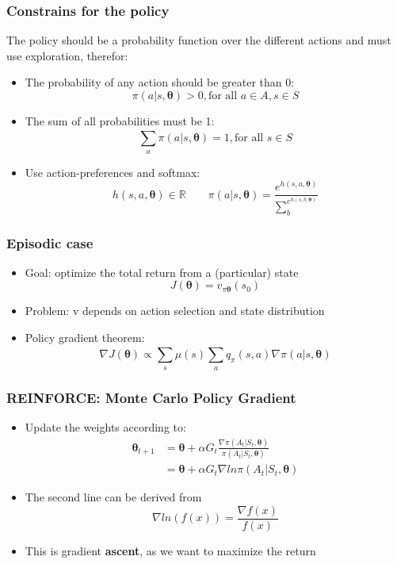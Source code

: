 \subsubsection*{Constrains for the policy}
The policy should be a probability function over the different actions and must use exploration, therefor:
\begin{itemize}
    \item The probability of any action should be greater than 0:
    \[
    \pi(a|s,\boldsymbol{\theta}) > 0, \text{for all } a \in A,s \in S
    \]
    \item The sum of all probabilities must be 1:
    \[
    \sum_{a}^{}\pi(a|s,\boldsymbol{\theta}) = 1, \text{for all } s \in S
    \]
    \item Use action-preferences and softmax:
    \[
    h(s,a,\mathbf{\theta})\in\mathbb{R} \qquad \pi(a|s,\boldsymbol{\theta}) = \frac{e^{h(s,a,\boldsymbol{\theta})}}{\sum_{b}^{e^{h(s,b,\boldsymbol{\theta})}}}
    \]
\end{itemize}

\subsubsection*{Episodic case}
\begin{itemize}
    \item Goal: optimize the total return from a (particular) state
    \[
    J(\boldsymbol{\theta}) = v_{\pi\boldsymbol{\theta}}(s_0)
    \]
    \item Problem: v depends on action selection and state distribution
    \item Policy gradient theorem:
    \[
    \nabla J({\boldsymbol{\theta}})\propto \sum_{s}^{}\mu(s)\sum_{a}^{}q_\pi(s,a)\nabla\pi(a|s,\boldsymbol{\theta})
    \]
\end{itemize}

\subsubsection*{REINFORCE: Monte Carlo Policy Gradient}
\begin{itemize}
    \item Update the weights according to:
    \begin{align*}
        \boldsymbol{\theta}_{t+1} &= \boldsymbol{\theta} + \alpha G_t\frac{\nabla\pi(A_t|S_t,\boldsymbol{\theta})}{\pi(A_t|S_t,\boldsymbol{\theta})}\\
        &= \boldsymbol{\theta} + \alpha G_t\nabla ln\pi(A_t|S_t, \boldsymbol{\theta})
    \end{align*}
    \item The second line can be derived from
    \[
    \nabla ln(f(x)) = \frac{\nabla f(x)}{f(x)}
    \]
    \item This is gradient \textbf{ascent}, as we want to maximize the return
\end{itemize}
